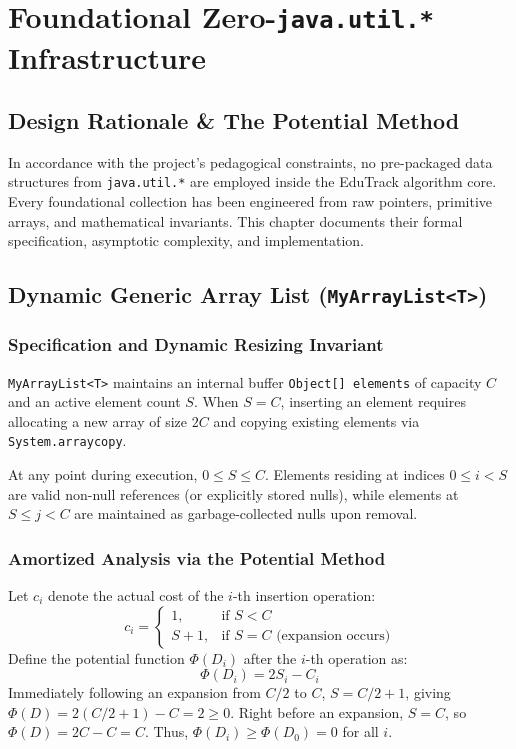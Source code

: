 \chapter{Foundational Zero-\texttt{java.util.*} Infrastructure}
\label{ch:core_structures}

\section{Design Rationale \& The Potential Method}
In accordance with the project's pedagogical constraints, no pre-packaged data structures from \texttt{java.util.*} are employed inside the EduTrack algorithm core. Every foundational collection has been engineered from raw pointers, primitive arrays, and mathematical invariants. This chapter documents their formal specification, asymptotic complexity, and implementation.

\section{Dynamic Generic Array List (\texttt{MyArrayList<T>})}
\subsection{Specification and Dynamic Resizing Invariant}
\texttt{MyArrayList<T>} maintains an internal buffer \texttt{Object[] elements} of capacity $C$ and an active element count $S$. When $S = C$, inserting an element requires allocating a new array of size $2C$ and copying existing elements via \texttt{System.arraycopy}.

\begin{invariant}
At any point during execution, $0 \le S \le C$. Elements residing at indices $0 \le i < S$ are valid non-null references (or explicitly stored nulls), while elements at $S \le j < C$ are maintained as garbage-collected nulls upon removal.
\end{invariant}

\subsection{Amortized Analysis via the Potential Method}
Let $c_i$ denote the actual cost of the $i$-th insertion operation:
\begin{equation}
c_i = \begin{cases}
1, & \text{if } S < C \\
S + 1, & \text{if } S = C \text{ (expansion occurs)}
\end{cases}
\end{equation}
Define the potential function $\Phi(D_i)$ after the $i$-th operation as:
\begin{equation}
\Phi(D_i) = 2S_i - C_i
\end{equation}
Immediately following an expansion from $C/2$ to $C$, $S = C/2 + 1$, giving $\Phi(D) = 2(C/2 + 1) - C = 2 \ge 0$. Right before an expansion, $S = C$, so $\Phi(D) = 2C - C = C$. Thus, $\Phi(D_i) \ge \Phi(D_0) = 0$ for all $i$.


